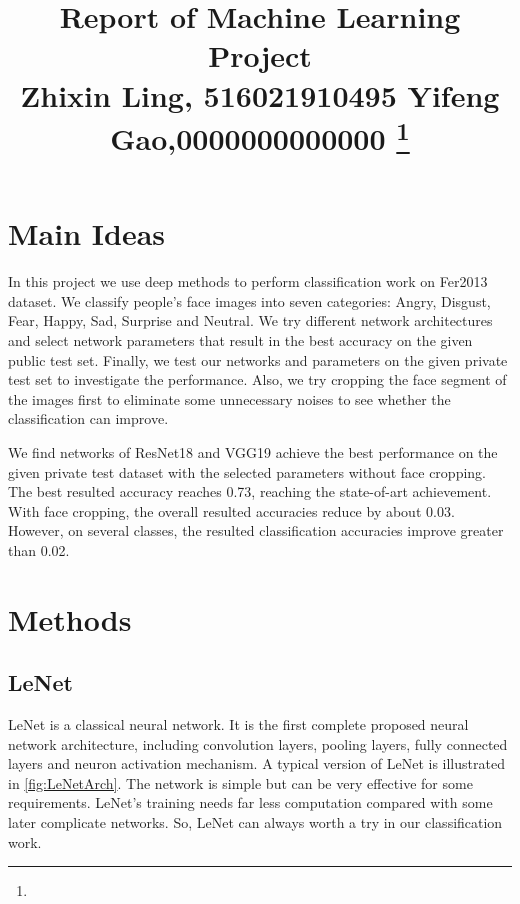 \documentclass[journal, onecolumn]{IEEEtran}
\begin{document}
\title{Report of Machine Learning Project\\
{\footnotesize Zhixin Ling, 516021910495  \quad  \quad  Yifeng Gao,0000000000000}
\thanks{}
}



\maketitle

\section{Main Ideas}
In this project we use deep methods to perform classification work on Fer2013 dataset. We classify people's face images into seven categories: Angry, Disgust, Fear, Happy, Sad, Surprise and Neutral. We try different network architectures and select network parameters that result in the best accuracy on the given public test set. Finally, we test our networks and parameters on the given private test set to investigate the performance. Also, we try cropping the face segment of the images first to eliminate some unnecessary noises to see whether the classification can improve.

We find networks of ResNet18 and VGG19 achieve the best performance on the given private test dataset with the selected parameters without face cropping. The best resulted accuracy reaches 0.73, reaching the state-of-art achievement. With face cropping, the overall resulted accuracies reduce by about 0.03. However, on several classes, the resulted classification accuracies improve greater than 0.02.

\section{Methods}

\subsection{LeNet}
LeNet is a classical neural network. It is the first complete proposed neural network architecture, including convolution layers, pooling layers, fully connected layers and neuron activation mechanism. A typical version of LeNet is illustrated in \ref{fig:LeNetArch}. The network is simple but can be very effective for some requirements. LeNet's training needs far less computation compared with some later complicate networks. So, LeNet can always worth a try in our classification work.
\end{document}
